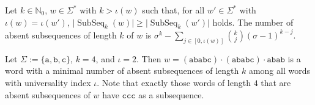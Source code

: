 \documentclass[runningheads,UKenglish,cleveref, autoref, thm-restate]{llncs}
\newcommand{\N}{\mathbb{N}}
\def\ta{\mathtt{a}}
\def\tb{\mathtt{b}}
\def\tc{\mathtt{c}}
\DeclareMathOperator\ScatFact{SubSeq}
\begin{document}
\begin{corollary}
    \label{corollary:min-absent-sf-count}
    Let $k\in\N_0$, $w \in \Sigma^*$ with $k > \iota(w)$ such that, for all $w' \in \Sigma^*$ with $\iota(w) = \iota(w')$, $\vert \ScatFact_k(w) \vert \geq \vert \ScatFact_k(w') \vert$ holds. The number of absent subsequences of length $k$ of $w$ is $\sigma^k - \sum_{j \in [0, \iota(w)]} \binom{k}{j} (\sigma-1)^{k - j}.$
\end{corollary}


\begin{example}\label{example:max-SF-word}
    Let $\Sigma := \{\ta,\tb,\tc\}$, $k = 4$, and $\iota = 2$. Then $w = (\ta\tb\ta\tb\tc)\cdot(\ta\tb\ta\tb\tc)\cdot\ta\tb\ta\tb$ is a word with a minimal number of absent subsequences of length $k$ among all words with universality index $\iota$.
    Note that exactly those words of length $4$ that are absent subsequences of $w$ have $\tc\tc\tc$ as a subsequence. %
\end{example}
\end{document}
